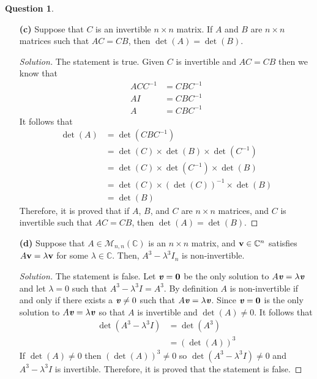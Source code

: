 \documentclass{article}
\newcommand{\C}{\mathbb{C}}
\newcommand{\curs}{\mathcal}
\renewcommand{\v}{{\bf v}}
\theoremstyle{definition}
\newtheorem{question}{Question}
\begin{document}
\begin{question}
\begin{enumerate}
\vspace{.25cm}

\item[{\bf (c)}] Suppose that $C$ is an invertible $n\times n$ matrix. If $A$ and $B$ are $n\times n$ matrices such that $AC = CB$, then $\det(A) = \det(B)$.

\begin{proof}[Solution]
    The statement is true. Given \(C\) is invertible and \(AC=CB\) then we know that
    \begin{align*}
        ACC^{-1} &= CBC^{-1} \\
        AI &= CBC^{-1} \\
        A &= CBC^{-1}
    \end{align*}
    It follows that
    \begin{align*}
        \det(A)
        &= \det(CBC^{-1}) \\
        &= \det(C)\times\det(B)\times\det(C^{-1}) \\
        &= \det(C)\times\det(C^{-1})\times\det(B) \\
        &= \det(C)\times(\det(C))^{-1}\times\det(B) \\
        &= \det(B)
    \end{align*}
    Therefore, it is proved that if \(A\), \(B\), and \(C\) are \(n \times n\)
    matrices, and \(C\) is invertible such that \(AC=CB\), then \(\det(A)=\det(B)\).
\end{proof}

\vspace{.25cm}

\item[{\bf (d)}] Suppose that $A\in\curs{M}_{n,n}(\C)$ is an $n\times n$ matrix, and $\v \in \C^n$ satisfies $A\v = \lambda\v$ for some $\lambda\in\C$. Then, $A^3 - \lambda^3I_n$ is non-invertible.

\begin{proof}[Solution]
    The statement is false. Let \(\textbf{\textit{v}}=\textbf{0}\) be the only solution to
    \(A\textbf{\textit{v}}=\lambda\textbf{\textit{v}}\) and let \(\lambda =0\) such that
    \(A^3-\lambda^3 I=A^3\). By definition \(A\) is non-invertible if and only if
    there exists a \(\textbf{\textit{v}}\neq0\) such that \(A\textbf{\textit{v}}=\lambda\textbf{\textit{v}}\).
    Since \(\textbf{\textit{v}}=\textbf{0}\) is the only solution to \(A\textbf{\textit{v}}=\lambda\textbf{\textit{v}}\)
    so that \(A\) is invertible and \(\det(A)\neq0\). It follows that
    \begin{align*}
        \det(A^3-\lambda^3 I)
        &= \det(A^3) \\
        &= (\det(A))^3
    \end{align*}
    If \(\det(A)\neq0\) then \((\det(A))^3\neq0\) so \(\det(A^3-\lambda^3 I)\neq0\)
    and \(A^3-\lambda^3 I\) is invertible. Therefore, it is proved that the
    statement is false.
\end{proof}

\end{enumerate}

\end{question}
\end{document}
